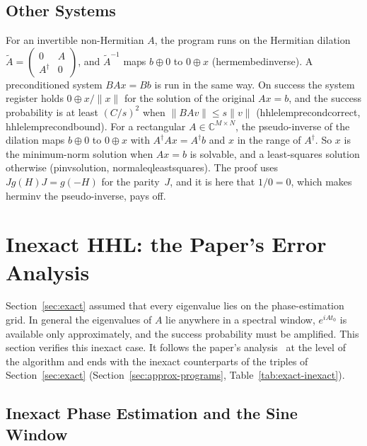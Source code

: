 \documentclass[runningheads]{llncs}
\newcommand{\C}{\mathbb{C}}
\newcommand{\norm}[1]{\|#1\|}
\DeclareRobustCommand{\isa}[1]{\textsf{\def\_{\char95\allowbreak}#1}}
\begin{document}
\subsection{Other Systems}\label{sec:exact-other}

For an invertible non-Hermitian $A$, the program runs on the Hermitian dilation
$\tilde A=\left(\begin{smallmatrix}0&A\\A^\dagger&0\end{smallmatrix}\right)$, and $\tilde A^{-1}$ maps
$b\oplus0$ to $0\oplus x$ (\isa{herm\_embed\_inverse}). A preconditioned system $BAx=Bb$ is run in the
same way. On success the system register holds $0\oplus x/\norm x$ for the solution of the original
$Ax=b$, and the success probability is at least $(C/s)^2$ when $\norm{BAv}\le s\norm v$
(\isa{hhl\_elem\_precond\_correct}, \isa{hhl\_elem\_precond\_bound}). For a rectangular
$A\in\C^{M\times N}$, the pseudo-inverse of the dilation maps $b\oplus0$ to $0\oplus x$ with
$A^\dagger Ax=A^\dagger b$ and $x$ in the range of $A^\dagger$. So $x$ is the minimum-norm solution
when $Ax=b$ is solvable, and a least-squares solution otherwise (\isa{pinv\_solution},
\isa{normal\_eq\_least\_squares}). The proof uses $Jg(H)J=g(-H)$ for the parity~$J$, and it is here
that $1/0=0$, which makes \isa{herm\_inv} the pseudo-inverse, pays off.
\section{Inexact HHL: the Paper's Error Analysis}\label{sec:approx}

Section~\ref{sec:exact} assumed that every eigenvalue lies on the phase-estimation grid. In general the
eigenvalues of $A$ lie anywhere in a spectral window, $e^{iAt_0}$ is available only approximately, and
the success probability must be amplified. This section verifies this inexact case. It follows the
paper's analysis~\cite[App.~A]{hhl2008arxiv} at the level of the algorithm and ends with the inexact
counterparts of the triples of Section~\ref{sec:exact} (Section~\ref{sec:approx-programs},
Table~\ref{tab:exact-inexact}).

\subsection{Inexact Phase Estimation and the Sine Window}
\end{document}
